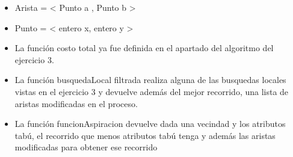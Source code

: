 \begin{itemize}
\item Arista = < Punto a , Punto b >
\item Punto = < entero x, entero y >
\item La función costo total ya fue definida en el apartado del algoritmo del ejercicio 3.
\item La función busquedaLocal filtrada realiza alguna de las busquedas locales vistas en el ejercicio 3 y devuelve además del mejor recorrido, una lista de aristas modificadas en el proceso.
\item La función funcionAspiracion devuelve dada una vecindad y los atributos tabú, el recorrido que menos atributos tabú tenga y además las aristas modificadas para obtener ese recorrido
\end{itemize}

